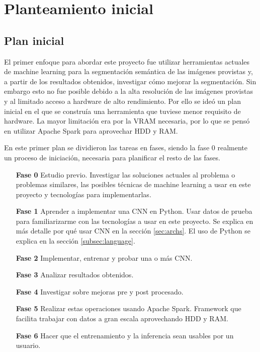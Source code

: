 \chapter{Planteamiento inicial}\label{planinicial}

\section{Plan inicial}\label{sec:planinicial}

El primer enfoque para abordar este proyecto fue utilizar herramientas actuales de machine learning para la segmentación semántica de las imágenes provistas y, a partir de los resultados obtenidos, investigar cómo mejorar la segmentación. Sin embargo esto no fue posible debido a la alta resolución de las imágenes provistas y al limitado acceso a hardware de alto rendimiento. Por ello se ideó un plan inicial en el que se construía una herramienta que tuviese menor requisito de hardware. La mayor limitación era por la VRAM necesaria, por lo que se pensó en utilizar Apache Spark \cite{apachespark} para aprovechar HDD y RAM.

En este primer plan se dividieron las tareas en fases, siendo la fase 0 realmente un proceso de iniciación, necesaria para planificar el resto de las fases.

\begin{itemize}
\item[\textbf{Fase 0}] Estudio previo. Investigar las soluciones actuales al problema o problemas similares, las posibles técnicas de machine learning a usar en este proyecto y tecnologías para implementarlas.
\item[\textbf{Fase 1}] Aprender a implementar una CNN en Python. Usar datos de prueba para familiarizarme con las tecnologías a usar en este proyecto. Se explica en más detalle por qué usar CNN en la sección \ref{sec:archs}. El uso de Python se explica en la sección \ref{subsec:language}.
\item[\textbf{Fase 2}] Implementar, entrenar y probar una o más CNN.
\item[\textbf{Fase 3}] Analizar resultados obtenidos.
\item[\textbf{Fase 4}] Investigar sobre mejoras pre y post procesado.
\item[\textbf{Fase 5}] Realizar estas operaciones usando Apache Spark. Framework que facilita trabajar con datos a gran escala aprovechando HDD y RAM.
\item[\textbf{Fase 6}] Hacer que el entrenamiento y la inferencia sean usables por un usuario.
\end{itemize}

